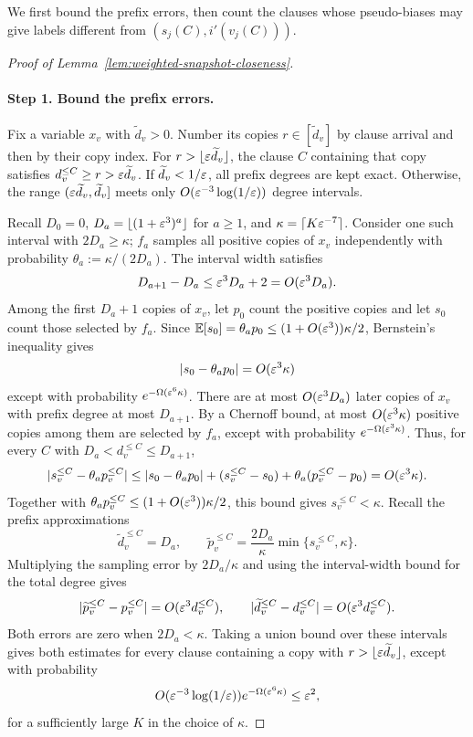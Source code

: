 We first bound the prefix errors, then count the clauses whose pseudo-biases may give labels different from $(s_j(C),i'(v_j(C)))$.
\begin{proof}[Proof of Lemma~\ref{lem:weighted-snapshot-closeness}]
\begin{samepage}
\leavevmode\par
\paragraph{Step 1. Bound the prefix errors.}
Fix a variable $x_v$ with $\widetilde d_v>0$. Number its copies $r\in[\widetilde d_v]$ by clause arrival and then by their copy index.
For $r>\lfloor\varepsilon\widetilde d_v\rfloor$, the clause $C$ containing that copy satisfies $d_v^{\le C}\ge r>\varepsilon\widetilde d_v$.
If $\widetilde d_v<1/\varepsilon$, all prefix degrees are kept exact.
Otherwise, the range $(\varepsilon\widetilde d_v,\widetilde d_v]$ meets only $O(\varepsilon^{-3}\log(1/\varepsilon))$ degree intervals.
\end{samepage}

Recall $D_0=0$, $D_a=\lfloor(1+\varepsilon^3)^a\rfloor$ for $a\ge1$, and $\kappa=\lceil K\varepsilon^{-7}\rceil$.
Consider one such interval with $2D_a\ge\kappa$; $f_a$ samples all positive copies of $x_v$ independently with probability $\theta_a:=\kappa/(2D_a)$.
The interval width satisfies
\[
  D_{a+1}-D_a\le\varepsilon^3D_a+2=O(\varepsilon^3D_a).
\]
Among the first $D_a+1$ copies of $x_v$, let $p_0$ count the positive copies and let $s_0$ count those selected by $f_a$.
Since $\mathbb E[s_0]=\theta_ap_0\le(1+O(\varepsilon^3))\kappa/2$, Bernstein's inequality gives
\[
  |s_0-\theta_ap_0|=O(\varepsilon^3\kappa)
\]
except with probability $e^{-\Omega(\varepsilon^6\kappa)}$.
There are at most $O(\varepsilon^3D_a)$ later copies of $x_v$ with prefix degree at most $D_{a+1}$.
By a Chernoff bound, at most $O(\varepsilon^3\kappa)$ positive copies among them are selected by $f_a$, except with probability $e^{-\Omega(\varepsilon^3\kappa)}$.
Thus, for every $C$ with $D_a<d_v^{\le C}\le D_{a+1}$,
\[
  |s_v^{\le C}-\theta_ap_v^{\le C}|
  \le |s_0-\theta_ap_0|+(s_v^{\le C}-s_0)
       +\theta_a(p_v^{\le C}-p_0)
  =O(\varepsilon^3\kappa).
\]
Together with $\theta_ap_v^{\le C}\le(1+O(\varepsilon^3))\kappa/2$, this bound gives $s_v^{\le C}<\kappa$.
Recall the prefix approximations
\[
  \widetilde d_v^{\le C}=D_a,\qquad
  \widetilde p_v^{\le C}=\frac{2D_a}{\kappa}\min\{s_v^{\le C},\kappa\}.
\]
Multiplying the sampling error by $2D_a/\kappa$ and using the interval-width bound for the total degree gives
\begin{equation}
  |\widetilde p_v^{\le C}-p_v^{\le C}|=O(\varepsilon^3d_v^{\le C}),\qquad
  |\widetilde d_v^{\le C}-d_v^{\le C}|=O(\varepsilon^3d_v^{\le C}).
  \label{eq:weighted-prefix-errors}
\end{equation}
Both errors are zero when $2D_a<\kappa$.
Taking a union bound over these intervals gives both estimates for every clause containing a copy with $r>\lfloor\varepsilon\widetilde d_v\rfloor$, except with probability
\[
  O(\varepsilon^{-3}\log(1/\varepsilon))e^{-\Omega(\varepsilon^6\kappa)}\le\varepsilon^2,
\]
for a sufficiently large $K$ in the choice of $\kappa$.


\end{proof}
